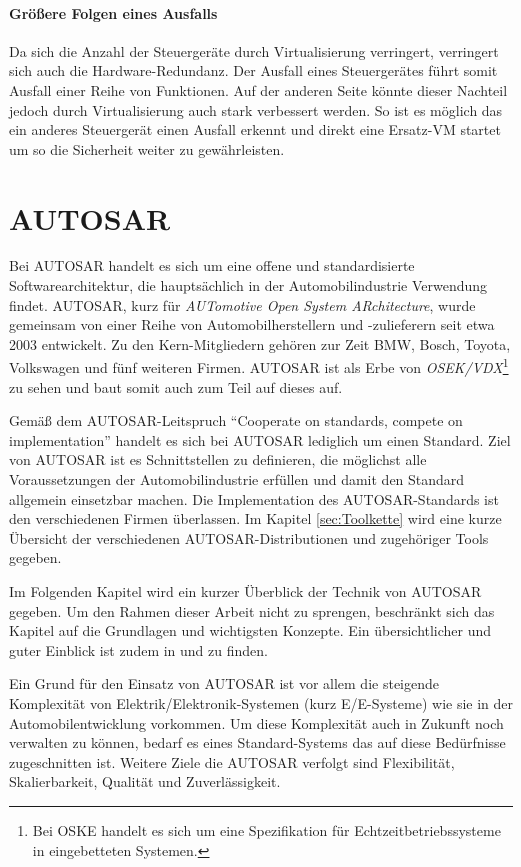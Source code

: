 \documentclass[
  a4paper,					    %
  twoside,
  DIV=calc,     				%
  bibliography=totoc,
  cleardoublepage=empty,
  ngerman,     					%
  final       					%
]{scrbook}
\begin{document}
\paragraph{Größere Folgen eines Ausfalls}
Da sich die Anzahl der Steuergeräte durch Virtualisierung verringert, verringert sich auch die Hardware-Redundanz. Der Ausfall eines Steuergerätes führt somit Ausfall einer Reihe von Funktionen. Auf der anderen Seite könnte dieser Nachteil jedoch durch Virtualisierung auch stark verbessert werden. So ist es möglich das ein anderes Steuergerät einen Ausfall erkennt und direkt eine Ersatz-VM startet um so die Sicherheit weiter zu gewährleisten. 


\section{AUTOSAR}
\label{sec:Autosar}
Bei AUTOSAR handelt es sich um eine offene und standardisierte Softwarearchitektur, die hauptsächlich in der Automobilindustrie Verwendung findet. AUTOSAR, kurz für \emph{AUTomotive Open System ARchitecture}, wurde gemeinsam von einer Reihe von Automobilherstellern und -zulieferern seit etwa 2003 entwickelt. Zu den Kern-Mitgliedern gehören zur Zeit BMW, Bosch, Toyota, Volkswagen und fünf weiteren Firmen. AUTOSAR ist als Erbe von \emph{OSEK/VDX}\footnote{Bei OSKE handelt es sich um eine Spezifikation für Echtzeitbetriebssysteme in eingebetteten Systemen.} zu sehen und baut somit auch zum Teil auf dieses auf.

Gemäß dem AUTOSAR-Leitspruch "`Cooperate on standards, compete on implementation"' handelt es sich bei AUTOSAR lediglich um einen Standard. Ziel von AUTOSAR ist es Schnittstellen zu definieren, die möglichst alle Voraussetzungen der Automobilindustrie erfüllen und damit den Standard allgemein einsetzbar machen. Die Implementation des AUTOSAR-Standards ist den verschiedenen Firmen überlassen. Im Kapitel \ref{sec:Toolkette} wird eine kurze Übersicht der verschiedenen AUTOSAR-Distributionen und zugehöriger Tools gegeben.

Im Folgenden Kapitel wird ein kurzer Überblick der Technik von AUTOSAR gegeben. Um den Rahmen dieser Arbeit nicht zu sprengen, beschränkt sich das Kapitel auf die Grundlagen und wichtigsten Konzepte. Ein übersichtlicher und guter Einblick ist zudem in \cite{autosar_layer} und \cite{autosar_techoverview} zu finden.

Ein Grund für den Einsatz von AUTOSAR ist vor allem die steigende Komplexität von Elektrik/Elektronik-Systemen (kurz E/E-Systeme) wie sie in der Automobilentwicklung vorkommen. Um diese Komplexität auch in Zukunft noch verwalten zu können, bedarf es eines Standard-Systems das auf diese Bedürfnisse zugeschnitten ist. Weitere Ziele die AUTOSAR verfolgt sind Flexibilität, Skalierbarkeit, Qualität und Zuverlässigkeit.\cite[S. 5]{autosar_techoverview}
\end{document}
